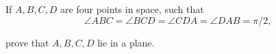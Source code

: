 If $ A,B,C,D$ are four points in space, such that\[ \angle ABC=\angle BCD=\angle CDA=\angle DAB=\pi/2,

\]

prove that $ A,B,C,D$ lie in a plane.